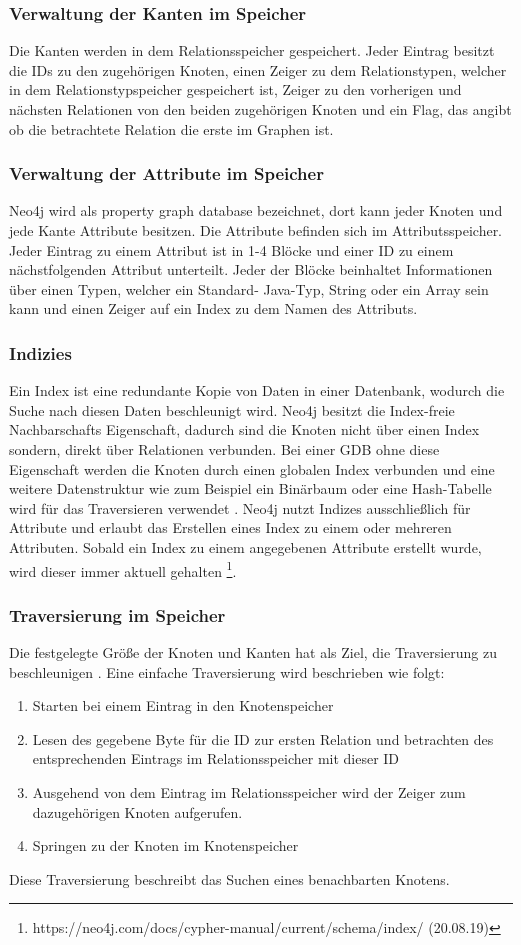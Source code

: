 \subsubsection{Verwaltung der Kanten im Speicher}
Die Kanten werden in dem Relationsspeicher gespeichert. Jeder Eintrag besitzt die IDs zu den zugehörigen Knoten, einen Zeiger zu dem Relationstypen, welcher in dem Relationstypspeicher gespeichert ist, Zeiger zu den vorherigen und nächsten Relationen von den beiden zugehörigen Knoten und ein Flag, das angibt ob die betrachtete Relation die erste im Graphen ist. 
\subsubsection{Verwaltung der Attribute im Speicher}
Neo4j wird als property graph database bezeichnet, dort kann jeder Knoten und jede Kante Attribute besitzen. Die Attribute befinden sich im Attributsspeicher. Jeder Eintrag zu einem Attribut ist in 1-4 Blöcke und einer ID zu einem nächstfolgenden Attribut unterteilt. Jeder der Blöcke beinhaltet Informationen über einen Typen, welcher ein Standard- Java-Typ, String oder ein Array sein kann und einen Zeiger auf ein Index zu dem Namen des Attributs.  
\subsubsection{Indizies}
Ein Index ist eine redundante Kopie von Daten in einer Datenbank, wodurch die Suche nach diesen Daten beschleunigt wird. Neo4j besitzt die Index-freie Nachbarschafts Eigenschaft, dadurch sind die Knoten nicht über einen Index  sondern, direkt über Relationen verbunden. Bei einer GDB ohne diese Eigenschaft werden die Knoten durch einen globalen Index verbunden und eine weitere Datenstruktur wie zum Beispiel ein Binärbaum oder eine Hash-Tabelle wird für das Traversieren verwendet \parencite{robinson2013graph}. \newline
Neo4j nutzt Indizes ausschließlich für Attribute und erlaubt das Erstellen eines Index zu einem oder mehreren Attributen. Sobald ein Index zu einem angegebenen Attribute erstellt wurde, wird dieser immer aktuell gehalten \footnote{https://neo4j.com/docs/cypher-manual/current/schema/index/ (20.08.19)}.  	
\subsubsection {Traversierung im Speicher}
Die festgelegte Größe der Knoten und Kanten hat als Ziel, die Traversierung zu beschleunigen \parencite{robinson2013graph}. Eine einfache Traversierung wird beschrieben wie folgt: 
\begin{enumerate}
	\item Starten bei einem Eintrag in den Knotenspeicher
	\item Lesen des gegebene Byte für die ID zur ersten Relation und betrachten des entsprechenden Eintrags im Relationsspeicher mit dieser ID
	\item Ausgehend von dem Eintrag im Relationsspeicher wird der Zeiger zum dazugehörigen Knoten aufgerufen.
	\item Springen zu der Knoten im Knotenspeicher
\end{enumerate}
Diese Traversierung beschreibt das Suchen eines benachbarten Knotens.
